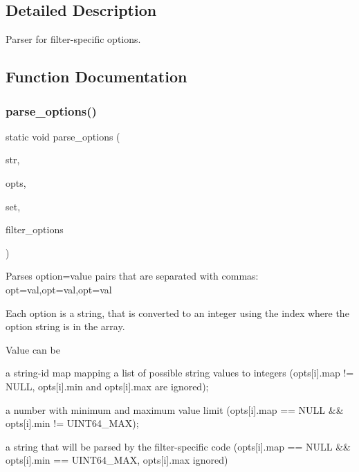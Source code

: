 \subsection{Detailed Description}
Parser for filter-\/specific options. 



\subsection{Function Documentation}
\mbox{\label{options_8c_a329ca50e0955eb59fcda39617f76b202}} 
\subsubsection{parse\+\_\+options()}
{\footnotesize\ttfamily static void parse\+\_\+options (\begin{DoxyParamCaption}\item[{const char $\ast$}]{str,  }\item[{const \textbf{ option\+\_\+map} $\ast$}]{opts,  }\item[{void($\ast$)(void $\ast$filter\+\_\+options, unsigned key, uint64\+\_\+t value, const char $\ast$valuestr)}]{set,  }\item[{void $\ast$}]{filter\+\_\+options }\end{DoxyParamCaption})\hspace{0.3cm}{\ttfamily [static]}}

Parses option=value pairs that are separated with commas\+: opt=val,opt=val,opt=val

Each option is a string, that is converted to an integer using the index where the option string is in the array.

Value can be
\begin{DoxyItemize}
\item a string-\/id map mapping a list of possible string values to integers (opts[i].map != N\+U\+LL, opts[i].min and opts[i].max are ignored);
\item a number with minimum and maximum value limit (opts[i].map == N\+U\+LL \&\& opts[i].min != U\+I\+N\+T64\+\_\+\+M\+AX);
\item a string that will be parsed by the filter-\/specific code (opts[i].map == N\+U\+LL \&\& opts[i].min == U\+I\+N\+T64\+\_\+\+M\+AX, opts[i].max ignored)
\end{DoxyItemize}

